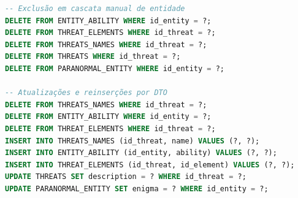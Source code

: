 \documentclass[12pt,a4paper]{report}
\begin{document}
\begin{lstlisting}[language=SQL, caption=Consultas feitas em ParanormalEntityDAO]
-- Exclusão em cascata manual de entidade
DELETE FROM ENTITY_ABILITY WHERE id_entity = ?;
DELETE FROM THREAT_ELEMENTS WHERE id_threat = ?;
DELETE FROM THREATS_NAMES WHERE id_threat = ?;
DELETE FROM THREATS WHERE id_threat = ?;
DELETE FROM PARANORMAL_ENTITY WHERE id_entity = ?;

-- Atualizações e reinserções por DTO
DELETE FROM THREATS_NAMES WHERE id_threat = ?;
DELETE FROM ENTITY_ABILITY WHERE id_entity = ?;
DELETE FROM THREAT_ELEMENTS WHERE id_threat = ?;
INSERT INTO THREATS_NAMES (id_threat, name) VALUES (?, ?);
INSERT INTO ENTITY_ABILITY (id_entity, ability) VALUES (?, ?);
INSERT INTO THREAT_ELEMENTS (id_threat, id_element) VALUES (?, ?);
UPDATE THREATS SET description = ? WHERE id_threat = ?;
UPDATE PARANORMAL_ENTITY SET enigma = ? WHERE id_entity = ?;
\end{lstlisting}
\end{document}
